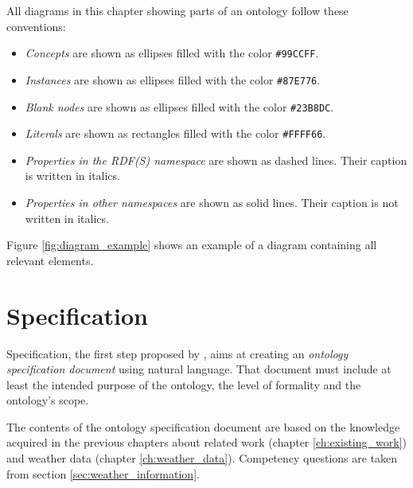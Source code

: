 
All diagrams in this chapter showing parts of an ontology follow these conventions:
\begin{itemize}
  \item \emph{Concepts} are shown as ellipses filled with the color \texttt{\textcolor{convention_color1}{\#99CCFF}}.
  \item \emph{Instances} are shown as ellipses filled with the color \texttt{\textcolor{convention_color2}{\#87E776}}.
  \item \emph{Blank nodes} are shown as ellipses filled with the color \texttt{\textcolor{convention_color3}{\#23B8DC}}.
  \item \emph{Literals} are shown as rectangles filled with the color \texttt{\colorbox{convention_color_bg4}{\textcolor{convention_color4}{\#FFFF66}}}.
  \item \emph{Properties in the RDF(S) namespace} are shown as dashed lines. Their caption is written in italics.
  \item \emph{Properties in other namespaces} are shown as solid lines. Their caption is not written in italics.
\end{itemize}
Figure \ref{fig:diagram_example} shows an example of a diagram containing all relevant elements.

\section{Specification}
\label{sec:ontology_specification}

Specification, the first step proposed by \methontology, aims at creating an \emph{ontology specification document} using natural language. That document must include at least the intended purpose of the ontology, the level of 
formality and the ontology's scope.

The contents of the ontology specification document are based on the knowledge acquired in the previous chapters about related work (chapter \ref{ch:existing_work}) and weather data (chapter \ref{ch:weather_data}). Competency questions are taken from section \ref{sec:weather_information}.

